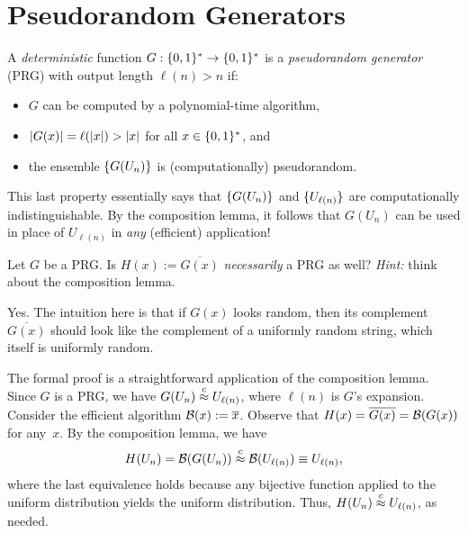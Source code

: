\documentclass[11pt]{article}
\begin{document}
\section{Pseudorandom Generators}
\label{sec:prgs}

\begin{definition}
  \label{def:prg}
  A \emph{deterministic} function $G : \{0,1\}^{*} \to \{0,1\}^{*}$ is a
  \emph{pseudorandom generator} (PRG) with output length $\ell(n) > n$
  if:
  \begin{itemize}
  \item $G$ can be computed by a polynomial-time algorithm,
  \item $\lvert G(x)\rvert = \ell(\lvert x\rvert) > \lvert x\rvert$ for all
    $x \in \{0,1\}^{*}$, and
  \item the ensemble $\{G(U_{n})\}$ is (computationally)
    pseudorandom.
  \end{itemize}
  
  This last property essentially says that $\{G(U_{n})\}$ and
  $\{U_{\ell(n)}\}$ are computationally indistinguishable. By the
  composition lemma, it follows that $G(U_{n})$ can be used in place
  of $U_{\ell(n)}$ in \emph{any} (efficient) application!
\end{definition}

\begin{question}
  Let \(G\) be a PRG. Is \(H(x) := \overline{G(x)}\)
  \emph{necessarily} a PRG as well?  \emph{Hint:} think about the
  composition lemma.
\end{question}
  
\begin{answer}
  Yes. The intuition here is that if \(G(x)\) looks random, then its
  complement \(\overline{G(x)}\) should look like the complement of a
  uniformly random string, which itself is uniformly random.

  The formal proof is a straightforward application of the composition
  lemma. Since \(G\) is a PRG, we have
  \(G(U_n) \stackrel{c}{\approx} U_{\ell(n)}\), where $\ell(n)$ is $G$'s
  expansion. Consider the efficient algorithm
  \(\mathcal{B}(x) := \overline{x}\). Observe that
  \(H(x) = \overline{G(x)} = \mathcal{B}(G(x))\) for any~$x$. By the
  composition lemma, we have
  \[ H(U_{n}) = \mathcal{B}(G(U_n)) \stackrel{c}{\approx} \mathcal{B}(U_{\ell(n)}) \equiv
    U_{\ell(n)}, \] where the last equivalence holds because any
  bijective function applied to the uniform distribution yields the
  uniform distribution. Thus, \(H(U_n) \stackrel{c}{\approx} U_{\ell(n)}\), as
  needed.
\end{answer}
\end{document}
